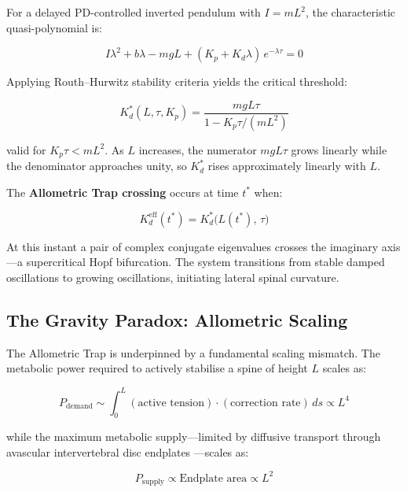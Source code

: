 \documentclass[12pt, letterpaper]{article}
\newcommand{\Kd}{K_d}
\newcommand{\Kdcrit}{K_d^{*}}
\newcommand{\Kdeff}{K_d^{\mathrm{eff}}}
\begin{document}
For a delayed PD-controlled inverted pendulum with $I = mL^{2}$, the
characteristic quasi-polynomial is:

\begin{equation}
  I\lambda^{2} + b\lambda - mgL
    + (K_p + \Kd\lambda)\,e^{-\lambda\tau} = 0
  \label{eq:chareq}
\end{equation}

Applying Routh--Hurwitz stability criteria \citep{Insperger2011} yields the
critical threshold:

\begin{equation}
  \boxed{\Kdcrit(L, \tau, K_p) = \frac{mgL\tau}{1 - K_p\tau/(mL^{2})}}
  \label{eq:Kdcrit}
\end{equation}

valid for $K_p\tau < mL^{2}$. As $L$ increases, the numerator $mgL\tau$ grows
linearly while the denominator approaches unity, so $\Kdcrit$ rises
approximately linearly with $L$.

The \textbf{Allometric Trap crossing} occurs at time $t^{*}$ when:

\begin{equation}
  \Kdeff(t^{*}) = \Kdcrit\!\bigl(L(t^{*}),\,\tau\bigr)
  \label{eq:crossing}
\end{equation}

At this instant a pair of complex conjugate eigenvalues crosses the imaginary
axis---a supercritical Hopf bifurcation. The system transitions from stable
damped oscillations to growing oscillations, initiating lateral spinal
curvature.

\subsection{The Gravity Paradox: Allometric Scaling}

The Allometric Trap is underpinned by a fundamental scaling mismatch. The
metabolic power required to actively stabilise a spine of height $L$ scales as:

\begin{equation}
  P_{\mathrm{demand}} \sim \int_0^L (\text{active tension})
    \cdot (\text{correction rate})\,ds \propto L^{4}
  \label{eq:demand}
\end{equation}

while the maximum metabolic supply---limited by diffusive transport through
avascular intervertebral disc endplates \citep{Urban2004}---scales as:

\begin{equation}
  P_{\mathrm{supply}} \propto \text{Endplate area} \propto L^{2}
  \label{eq:supply}
\end{equation}
\end{document}
